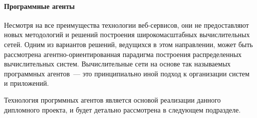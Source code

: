 \paragraph{Программные агенты}
Несмотря на все преимущества технологии веб-сервисов, они не предоставляют новых методологий и решений построения широкомасштабных вычислительных сетей. Одним из вариантов решений, ведущихся в этом направлении, может быть рассмотрена агентно-ориентированная парадигма построения распределенных вычислительных систем. Вычислительные сети на основе так называемых программных агентов~--- это принципиально иной подход к организации систем и приложений.

Технология прогрммных агентов является основой реализации данного дипломного проекта, и будет детально рассмотрена в следующем подразделе.
